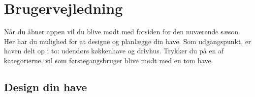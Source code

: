 \section{Brugervejledning}

Når du åbner appen vil du blive mødt med forsiden for den nuværende sæson. Her har du mulighed for at designe og planlægge din have. Som udgangspunkt, er haven delt op i to: udendørs køkkenhave og drivhus. Trykker du på en af kategorierne, vil som førstegangsbruger blive mødt med en tom have.

\subsection{Design din have}

\begin{minipage}{0.4\textwidth}
\begin{figure}[H]
    \centering

\end{figure}
\end{minipage}
